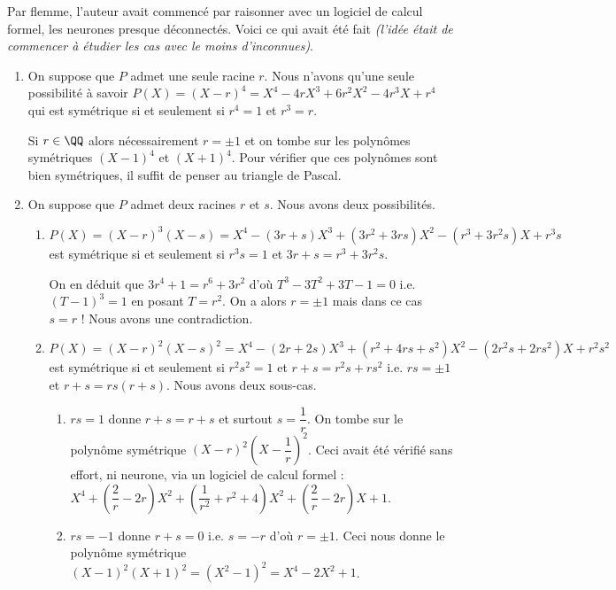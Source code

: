 Par flemme, l'auteur avait commencé par raisonner avec un logiciel de calcul formel, les neurones presque déconnectés. Voici ce qui avait été fait \emph{(l'idée était de commencer à étudier les cas avec le moins d'inconnues)}.

\begin{enumerate}
	\item On suppose que $P$ admet une seule racine $r$.
	Nous n'avons qu'une seule possibilité à savoir
	$P(X) = (X - r)^4
	      = X^4
	      - 4 r X^3
	      + 6 r^2 X^2
	      - 4 r^3 X
	      + r^4$
	qui est symétrique si et seulement si $r^4 = 1$ et $r^3 = r$.
	       
	       \noindent Si $r\in \QQ$ alors nécessairement $r = \pm 1$ et on tombe sur les polynômes symétriques $(X - 1)^4$ et $(X + 1)^4$. Pour vérifier que ces polynômes sont bien symétriques, il suffit de penser au triangle de Pascal. 


	\item On suppose que $P$ admet deux racines $r$ et $s$.
	Nous avons deux possibilités.
	\begin{enumerate}
		\item
		$P(X) = (X - r)^3 (X - s)
		      = X^4
		      - (3 r + s) X^3
		      + (3 r^2 + 3 r s) X^2
		      - (r^3 + 3 r^2 s) X
		      + r^3 s$
		est symétrique si et seulement si $r^3 s = 1$ et $3 r + s = r^3 + 3 r^2 s$.
	       
		\noindent
		On en déduit que $3 r^4 + 1 = r^6 + 3 r^2$
		d'où $T^3 - 3 T^2 + 3 T - 1 = 0$ i.e. $(T - 1)^3 = 1$
		en posant $T = r^2$.
		On a alors $r = \pm 1$ mais dans ce cas $s = r$ !
		Nous avons une contradiction. 


		\item
		$P(X) = (X - r)^2 (X - s)^2
		      = X^4
		      - (2 r  + 2 s) X^3
		      + (r^2 + 4 r s + s^2) X^2
		      - (2 r^2 s + 2 r s^2) X
		      + r^2 s^2$
		est symétrique si et seulement si
		$r^2 s^2 = 1$ et $r + s = r^2 s + r s^2$
		i.e. $r s = \pm 1$ et $r + s = rs(r + s)$. Nous avons deux sous-cas.
		\begin{enumerate}
			\item $r s = 1$ donne $r  + s = r + s$ et surtout $s = \dfrac1r$.
			On tombe sur le polynôme symétrique $(X - r)^2 \left( X - \dfrac1r \right)^2$.
			Ceci avait été vérifié sans effort, ni neurone, via un logiciel de calcul formel :
	 		$ X^4
			+ \left( \dfrac2r - 2 r \right) X^2
			+ \left( \dfrac{1}{r^2} + r^2 + 4 \right) X^2
			+ \left( \dfrac2r - 2 r \right) X
			+ 1$.


			\item $r s = -1$ donne $r  + s = 0$ i.e. $s = - r$ d'où $r = \pm 1$.
			Ceci nous donne le polynôme symétrique
			$ (X - 1)^2 ( X + 1)^2
			= (X^2 - 1)^2
			= X^4 - 2 X ^2 + 1$.
		\end{enumerate}
	\end{enumerate}


\end{enumerate}
